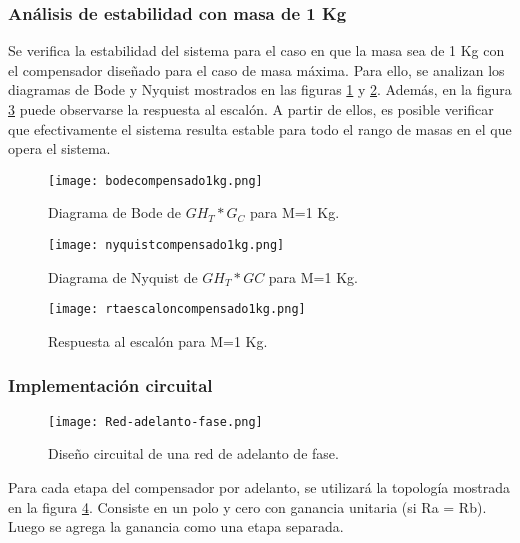 \subsubsection{Análisis de estabilidad con masa de 1 Kg}

\noindent Se verifica la estabilidad del sistema  para el caso en que la masa sea de 1 Kg con el compensador dise\~{n}ado para el caso de masa m\'{a}xima. Para ello, se analizan los diagramas de Bode y Nyquist mostrados en las figuras \ref{fig:bode-analog-para-M-1Kg} y \ref{fig:nyquist-analog-para-M-1Kg}. Adem\'{a}s, en la figura \ref{fig:respuesta-analog-al-escalon-para-M-1Kg} puede observarse la respuesta al escal\'{o}n. A partir de ellos, es posible verificar que efectivamente el sistema resulta estable para todo el rango de masas en el que opera el sistema. 


\begin{figure}[H]
	\centering
	\texttt{[image: bodecompensado1kg.png]}
	\caption{Diagrama de Bode de $GH_T*G_C$ para M=1 Kg.}
	\label{fig:bode-analog-para-M-1Kg}
\end{figure}

\begin{figure}[H]
	\centering
	\texttt{[image: nyquistcompensado1kg.png]}
	\caption{Diagrama de Nyquist de $GH_T*GC$ para M=1 Kg.}
	\label{fig:nyquist-analog-para-M-1Kg}
\end{figure}

\begin{figure}[H]
	\centering
	\texttt{[image: rtaescaloncompensado1kg.png]}
	\caption{Respuesta al escalón para M=1 Kg.}
	\label{fig:respuesta-analog-al-escalon-para-M-1Kg}
\end{figure}

\subsubsection{Implementación circuital}

\begin{figure}[H]
	\centering
	\texttt{[image: Red-adelanto-fase.png]}
	\caption{Diseño circuital de una red de adelanto de fase.}
	\label{fig:red-adelanto-fase}
\end{figure}


\noindent Para cada etapa del compensador por adelanto, se utilizará la topología mostrada en la figura \ref{fig:red-adelanto-fase}. Consiste en  un polo y cero con ganancia unitaria (si Ra = Rb). Luego se agrega la ganancia como una etapa separada.


